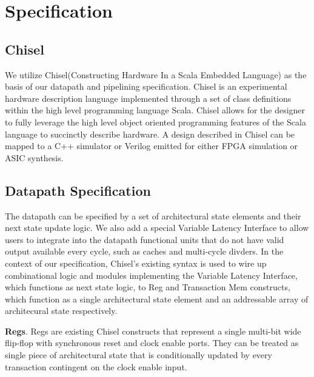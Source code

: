 \section{Specification}

\subsection{Chisel}
We utilize Chisel(Constructing Hardware In a Scala Embedded Language) as the basis of our datapath and pipelining specification. Chisel is an experimental hardware description language implemented through a set of class definitions within the high level programming language Scala. Chisel allows for the designer to fully leverage the high level object oriented programming features of the Scala language to succinctly describe hardware. A design described in Chisel can be mapped to a C++ simulator or Verilog emitted for either FPGA simulation or ASIC synthesis.
\subsection{Datapath Specification}
The datapath can be specified by a set of architectural state elements and their next state update logic. We also add a special Variable Latency Interface to allow users to integrate into the datapath functional units that do not have valid output available every cycle, such as caches and multi-cycle divders. In the context of our specification, Chisel's existing syntax is used to wire up combinational logic and modules implementing the Variable Latency Interface, which functions as next state logic, to Reg and Transaction Mem constructs, which function as a single architectural state element and an addressable array of architecural state respectively.

{\bf Regs}. Regs are existing Chisel constructs that represent a single multi-bit wide flip-flop with synchronous reset and clock enable ports. They can be treated as single piece of architectural state that is conditionally updated by every transaction contingent on the clock enable input.

